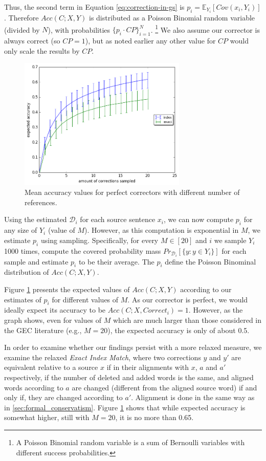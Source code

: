 \documentclass[letter,11pt]{article}
\begin{document}
Thus, the second
term in Equation \ref{eq:correction-in-gs} is $p_i = \mathbb{E}_{Y_i}[Cov(x_i,Y_i)]$. Therefore $Acc(C;X,Y)$ is distributed as
a Poisson Binomial random variable (divided by $N$), with probabilities $\{p_i \cdot CP\}_{i=1}^N$. \footnote{A Poisson Binomial random variable is a sum of Bernoulli variables with different success probabilities.} We also assume our corrector is always correct (so $CP=1$), but as noted earlier any other value for $CP$ would only scale the results by $CP$.

 \begin{figure}
   	\includegraphics[width=8cm]{repeat_1000_accuracy}
 	\caption{Mean accuracy values for perfect correctors with different number of references.} \label{fig:accuracy_vals}
 \end{figure}

 Using the estimated $\mathcal{D}_i$ for each source sentence $x_i$, we can now compute $p_i$ for any
 size of $Y_i$ (value of $M$). However, as this computation is exponential in $M$, we estimate $p_i$ using
 sampling. Specifically, for every $M\in[20]$ and $i$ we sample $Y_i$ 1000 times, compute 
 the covered probability mass $Pr_{\mathcal{D}_i}[\{y: y \in Y_i\}]$ for each sample and estimate $p_i$ to be their
 average. The $p_i$ define the Poisson Binominal distribution of $Acc(C;X,Y)$.

 Figure \ref{fig:accuracy_vals} presents the expected values of $Acc(C;X,Y)$ according to our estimates of $p_i$ for
 different values of $M$. As our corrector is perfect, we would ideally expect its accuracy to be
 $Acc(C;X,Correct_i) = 1$. However, as the graph shows, even for values of $M$ which are much larger than
 those considered in the GEC literature (e.g., $M=20$), the expected accuracy is only of about 0.5.
 
 In order to examine whether our findings persist with a more relaxed measure, we examine the relaxed
 {\it Exact Index Match}, where two corrections $y$ and $y'$
 are equivalent relative to a source $x$ if in their alignments with $x$, $a$ and $a'$ respectively,
 if the number of deleted and added words is the same, and aligned words according to $a$ are
 changed (different from the aligned source word) if and only if, they are changed according to $a'$. Alignment is done in the same way as in \ref{sec:formal_conservatism}. Figure \ref{fig:accuracy_vals}
 shows that while expected accuracy is somewhat higher, still with $M=20$, it is no more than 0.65.
 
\end{document}
